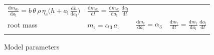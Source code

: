 \documentclass[10pt,twoside]{article}
\begin{document}
\begin{table}[ht]
\begin{tabular}{p{2.5cm}p{3.5cm}p{5cm}p{4cm} }
    $\frac{\textrm{d}m_\textrm{sb}}{\textrm{d}a_\textrm{l}} = b \, \theta \, \rho \, \eta_c\big( h + a_\textrm{l} \, \frac{\textrm{d}h}{\textrm{d}a_\textrm{l}} \big)$ &
    $\frac{\textrm{d}m_\textrm{sb}}{\textrm{d}t}  = \frac{\textrm{d}m_\textrm{sb}}{\textrm{d}a_\textrm{l}} \, \frac{\textrm{d}a_\textrm{l}}{\textrm{d}t}$ \\
  root mass &
    $m_\textrm{r} = \alpha_3 \, a_\textrm{l}$ &
    $\frac{\textrm{d}m_\textrm{r}}{\textrm{d}a_\textrm{l}} = \alpha_3$  &
    $\frac{\textrm{d}m_\textrm{r}}{\textrm{d}t}  = \frac{\textrm{d}m_\textrm{r}}{\textrm{d}a_\textrm{l}}  \, \frac{\textrm{d}a_\textrm{l}}{\textrm{d}t}$ \\ 
  \hline \\
\end{tabular}
\label{tab:allometry}
\end{table}

\newpage

\begin{table}[h!]
\caption{Model parameters}

\label{tab:params}
\end{table}

\clearpage


\end{document}
